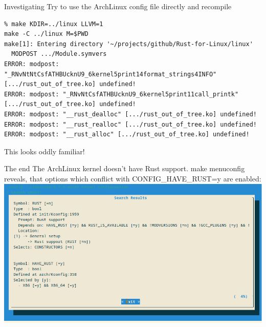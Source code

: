 \begin{frame}[c,fragile]{Investigating}
Try to use the ArchLinux config file directly and recompile
\begin{verbatim}
% make KDIR=../linux LLVM=1
make -C ../linux M=$PWD
make[1]: Entering directory '~/projects/github/Rust-for-Linux/linux'
  MODPOST .../Module.symvers
ERROR: modpost: "_RNvNtNtCsfATHBUcknU9_6kernel5print14format_strings4INFO" [.../rust_out_of_tree.ko] undefined!
ERROR: modpost: "_RNvNtCsfATHBUcknU9_6kernel5print11call_printk" [.../rust_out_of_tree.ko] undefined!
ERROR: modpost: "__rust_dealloc" [.../rust_out_of_tree.ko] undefined!
ERROR: modpost: "__rust_realloc" [.../rust_out_of_tree.ko] undefined!
ERROR: modpost: "__rust_alloc" [.../rust_out_of_tree.ko] undefined!
\end{verbatim}
\pause This looks oddly familiar!
\end{frame}

\begin{frame}[c,fragile]{The end}
\small The ArchLinux kernel doesn't have Rust support. make menuconfig
reveals, that options which conflict with CONFIG\_HAVE\_RUST=y are enabled:
\includegraphics[height=0.75\textheight]{img/make-menuconfig.png}
\end{frame}


